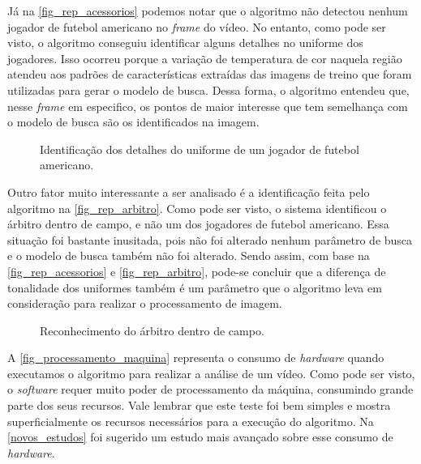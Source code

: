 Já na \autoref{fig_rep_acessorios} podemos notar que o algoritmo não detectou nenhum jogador de futebol americano no \textit{frame} do vídeo. No entanto, como pode ser visto, o algoritmo conseguiu identificar alguns detalhes no uniforme dos jogadores. Isso ocorreu porque a variação de temperatura de cor naquela região atendeu aos padrões de características extraídas das imagens de treino que foram utilizadas para gerar o modelo de busca. Dessa forma, o algoritmo entendeu que, nesse \textit{frame} em especifico, os pontos de maior interesse que tem semelhança com o modelo de busca são os identificados na imagem.

\begin{figure}[ht]
	\caption{\label{fig_rep_acessorios}Identificação dos detalhes do uniforme de um jogador de futebol americano.}
	\begin{center}
	\end{center}
	\centering {}
\end{figure}

Outro fator muito interessante a ser analisado é a identificação feita pelo algoritmo na \autoref{fig_rep_arbitro}. Como pode ser visto, o sistema identificou o árbitro dentro de campo, e não  um dos jogadores de futebol americano. Essa situação foi bastante inusitada, pois não foi alterado nenhum parâmetro de busca e o modelo de busca também não foi alterado. Sendo assim, com base na \autoref{fig_rep_acessorios} e \autoref{fig_rep_arbitro}, pode-se concluir que a diferença de tonalidade dos uniformes também é um parâmetro que o algoritmo leva em consideração para realizar o processamento de imagem.

\clearpage

\begin{figure}[ht]
	\caption{\label{fig_rep_arbitro}Reconhecimento do árbitro dentro de campo.}
	\begin{center}
	\end{center}
	\centering {}
\end{figure}

A \autoref{fig_processamento_maquina}  representa o consumo de \textit{hardware} quando executamos o algoritmo para realizar a análise de um vídeo. Como pode ser visto, o \textit{software} requer muito poder de processamento da máquina, consumindo grande parte dos seus recursos.  Vale lembrar que este teste foi bem simples e mostra superficialmente os recursos necessários para a execução do algoritmo. Na \autoref{novos_estudos} foi sugerido um estudo mais avançado sobre esse consumo de \textit{hardware}.


